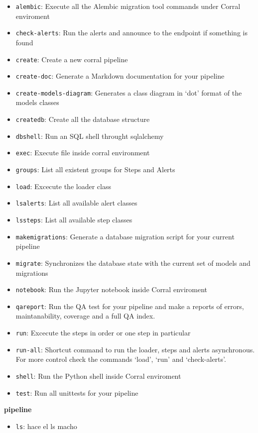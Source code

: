 \begin{itemize}
\tightlist
\item
  \texttt{alembic}: Execute all the Alembic migration tool commands
  under Corral enviroment
\item
  \texttt{check-alerts}: Run the alerts and announce to the endpoint if
  something is found
\item
  \texttt{create}: Create a new corral pipeline
\item
  \texttt{create-doc}: Generate a Markdown documentation for your
  pipeline
\item
  \texttt{create-models-diagram}: Generates a class diagram in `dot'
  format of the models classes
\item
  \texttt{createdb}: Create all the database structure
\item
  \texttt{dbshell}: Run an SQL shell throught sqlalchemy
\item
  \texttt{exec}: Execute file inside corral environment
\item
  \texttt{groups}: List all existent groups for Steps and Alerts
\item
  \texttt{load}: Excecute the loader class
\item
  \texttt{lsalerts}: List all available alert classes
\item
  \texttt{lssteps}: List all available step classes
\item
  \texttt{makemigrations}: Generate a database migration script for your
  current pipeline
\item
  \texttt{migrate}: Synchronizes the database state with the current set
  of models and migrations
\item
  \texttt{notebook}: Run the Jupyter notebook inside Corral enviroment
\item
  \texttt{qareport}: Run the QA test for your pipeline and make a
  reports of errors, maintanability, coverage and a full QA index.
\item
  \texttt{run}: Excecute the steps in order or one step in particular
\item
  \texttt{run-all}: Shortcut command to run the loader, steps and alerts
  asynchronous. For more control check the commands `load', `run' and
  `check-alerts'.
\item
  \texttt{shell}: Run the Python shell inside Corral enviroment
\item
  \texttt{test}: Run all unittests for your pipeline
\end{itemize}

\textbf{pipeline}

\begin{itemize}
\tightlist
\item
  \texttt{ls}: hace el ls macho
\end{itemize}

